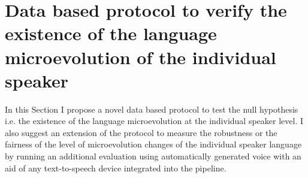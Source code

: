 \section{Data based protocol to verify the existence of the language microevolution of the individual speaker}

In this Section I propose a novel data based protocol to test the null hypothesis i.e. the existence of the language microevolution at the individual speaker level. I also suggest an extension of the protocol to measure the robustness or the fairness of the level of microevolution changes of the individual speaker language by running an additional evaluation using automatically generated voice with an aid of any text-to-speech device integrated into the pipeline. 
